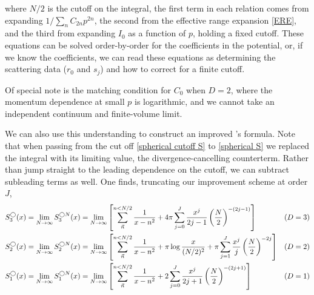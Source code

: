 where $N/2$ is the cutoff on the integral, the first term in each relation comes from expanding $1/\sum_n C_{2n} p^{2n}$, the second from the effective range expansion \eqref{ERE}, and the third from expanding $I_0$ as a function of $p$, holding a fixed cutoff.  These equations can be solved order-by-order for the coefficients in the potential, or, if we know the coefficients, we can read these equations as determining the scattering data ($r_0$ and $s_j$) and how to correct for a finite cutoff.

Of special note is the matching condition for $C_0$ when $D=2$, where the momentum dependence at small $p$ is logarithmic, and we cannot take an independent continuum and finite-volume limit.

We can also use this understanding to construct an improved \Luscher's formula.
Note that when passing from the cut off \eqref{spherical cutoff S} to \eqref{spherical S} we replaced the integral with its limiting value, the divergence-cancelling counterterm.
Rather than jump straight to the leading dependence on the cutoff, we can subtract subleading terms as well.
One finds, truncating our improvement scheme at order $J$,
\begin{align}
    S_3^\bigcirc(x)  = \lim_{N\rightarrow\infty} S^{\bigcirc N}_3(x)
    &=
    \lim_{N\rightarrow\infty}\left[\sum_{\vec{n}}^{n<N/2} \frac{1}{x-n^2}
        + 4\pi \sum_{j=0}^{J} \frac{x^j}{2j-1} \left(\frac{N}{2}\right)^{-(2j-1)}
    \right]
    &
    (D&=3)
    \\
    S_2^\bigcirc(x)  = \lim_{N\rightarrow\infty} S^{\bigcirc N}_2(x)
    &=
    \lim_{N\rightarrow\infty}\left[\sum_{\vec{n}}^{n<N/2} \frac{1}{x-n^2}
        + \pi \log \frac{x}{(N/2)^2}
        + \pi \sum_{j=1}^{J} \frac{x^j}{j} \left(\frac{N}{2}\right)^{-2j}
    \right]
    &
    (D&=2)
    \\
    S_1^\bigcirc(x)  = \lim_{N\rightarrow\infty} S^{\bigcirc N}_1(x)
    &=
    \lim_{N\rightarrow\infty}\left[\sum_{\vec{n}}^{n<N/2} \frac{1}{x-n^2}
        + 2 \sum_{j=0}^{J} \frac{x^j}{2j+1}\left(\frac{N}{2}\right)^{-(2j+1)}
        \right]
    &
    (D&=1)
\end{align}


\begin{center}
\end{center}

